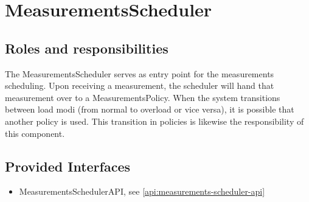 \section{MeasurementsScheduler}
\label{element:measurements-scheduler}

\subsection{Roles and responsibilities}

\npar The MeasurementsScheduler serves as entry point for the measurements
scheduling. Upon receiving a measurement, the scheduler will hand that
measurement over to a MeasurementsPolicy. When the system transitions between
load modi (from normal to overload or vice versa), it is possible that another
policy is used. This transition in policies is likewise the responsibility of
this component.

\subsection{Provided Interfaces}

\begin{itemize}
    \item MeasurementsSchedulerAPI, see \ref{api:measurements-scheduler-api}
\end{itemize}